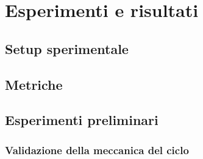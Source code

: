 \chapter{Esperimenti e risultati}
\label{ch:risultati}


\section{Setup sperimentale}

\section{Metriche}

\section{Esperimenti preliminari}

\subsection{Validazione della meccanica del ciclo}


